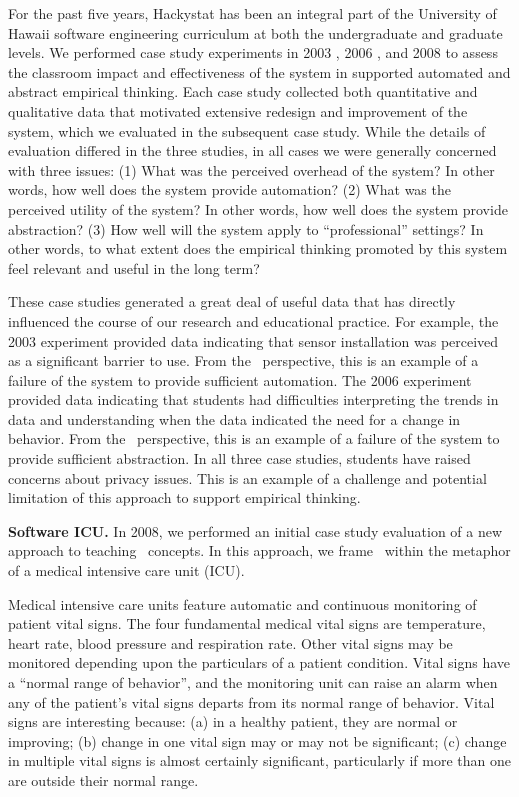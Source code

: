 For the past five years, Hackystat has been an integral part of the
University of Hawaii software engineering curriculum at both the
undergraduate and graduate levels.  We performed case study experiments in
2003 \citep{csdl2-03-12,csdl2-03-13}, 2006 \citep{csdl2-07-02}, and 2008
\citep{csdl2-09-02,csdl2-09-03} to assess the classroom impact and
effectiveness of the system in supported automated and abstract empirical
thinking.  Each case study collected both quantitative and qualitative data
that motivated extensive redesign and improvement of the system, which we
evaluated in the subsequent case study. While the details of evaluation
differed in the three studies, in all cases we were generally concerned
with three issues: (1) What was the perceived overhead of the system? In
other words, how well does the system provide automation?  (2) What was the
perceived utility of the system? In other words, how well does the system
provide abstraction?  (3) How well will the system apply to
``professional'' settings?  In other words, to what extent does the
empirical thinking promoted by this system feel relevant and useful in the
long term?

These case studies generated a great deal of useful data that has directly
influenced the course of our research and educational practice. For
example, the 2003 experiment provided data indicating that sensor
installation was perceived as a significant barrier to use. From the \eCT\
perspective, this is an example of a failure of the system to provide
sufficient automation.  The 2006 experiment provided data indicating that
students had difficulties interpreting the trends in data and understanding
when the data indicated the need for a change in behavior.  From the \eCT\
perspective, this is an example of a failure of the system to provide
sufficient abstraction.  In all three case studies, students have raised
concerns about privacy issues.  This is an example of a challenge and
potential limitation of this approach to support empirical thinking.

{\bf Software ICU.}  In 2008, we performed an initial case study evaluation 
of a new approach to teaching \eCT\ concepts.  In this approach, we frame 
\eCT\ within the metaphor of a medical intensive care unit (ICU). 

Medical intensive care units feature automatic and continuous monitoring of
patient vital signs.  The four fundamental medical vital signs are
temperature, heart rate, blood pressure and respiration rate.  Other vital signs
may be monitored depending upon the particulars of a patient condition.
Vital signs have a ``normal range of behavior'', and the monitoring unit
can raise an alarm when any of the patient's vital signs departs from its
normal range of behavior.  Vital signs are interesting because: (a) in a
healthy patient, they are normal or improving; (b) change in one vital sign
may or may not be significant; (c) change in multiple vital signs is almost
certainly significant, particularly if more than one are outside their
normal range.

